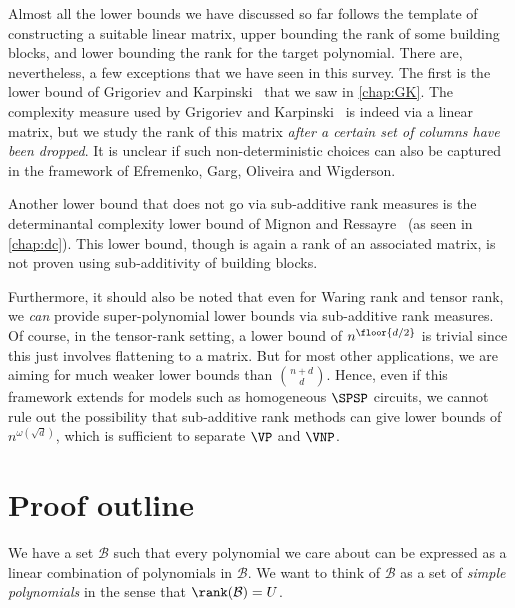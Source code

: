 Almost all the lower bounds we have discussed so far follows the template of constructing a suitable linear matrix, upper bounding the rank of some building blocks, and lower bounding the rank for the target polynomial. There are, nevertheless, a few exceptions that we have seen in this survey. The first is the lower bound of Grigoriev and Karpinski~\cite{grigoriev98} that we saw in \autoref{chap:GK}. The complexity measure used by Grigoriev and Karpinski~\cite{gr00} is indeed via a linear matrix, but we study the rank of this matrix \emph{after a certain set of columns have been dropped}. It is unclear if such non-deterministic choices can also be captured in the framework of Efremenko, Garg, Oliveira and Wigderson.

Another lower bound that does not go via sub-additive rank measures is the determinantal complexity lower bound of Mignon and Ressayre~\cite{mr04} (as seen in \autoref{chap:dc}). This lower bound, though is again a rank of an associated matrix, is not proven using sub-additivity of building blocks.

Furthermore, it should also be noted that even for Waring rank and tensor rank, we \emph{can} provide super-polynomial lower bounds via sub-additive rank measures. Of course, in the tensor-rank setting, a lower bound of $n^{\floor{d/2}}$ is trivial since this just involves flattening to a matrix. But for most other applications, we are aiming for much weaker lower bounds than $\binom{n+d}{d}$. Hence, even if this framework extends for models such as homogeneous $\SPSP$ circuits, we cannot rule out the possibility that sub-additive rank methods can give lower bounds of $n^{\omega(\sqrt{d})}$, which is sufficient to separate $\VP$ and $\VNP$. 

\section*{Proof outline}

We have a set $\mathcal{B}$ such that every polynomial we care about can be expressed as a linear combination of polynomials in $\mathcal{B}$. We want to think of $\mathcal{B}$ as a set of \emph{simple polynomials} in the sense that  $\rank(\mathcal{B}) = U$.

